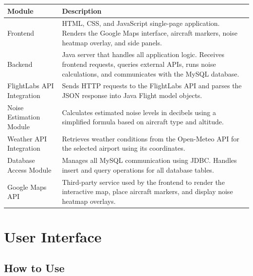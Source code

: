 \documentclass[12pt]{article}
\begin{document}
\begin{tabular}{|l|p{9.5cm}|}
\hline
Module & Description \\
\hline
Frontend & HTML, CSS, and JavaScript single-page application. Renders the Google Maps interface, aircraft markers, noise heatmap overlay, and side panels. \\
\hline
Backend & Java server that handles all application logic. Receives frontend requests, queries external APIs, runs noise calculations, and communicates with the MySQL database. \\
\hline
FlightLabs API Integration & Sends HTTP requests to the FlightLabs API and parses the JSON response into Java Flight model objects. \\
\hline
Noise Estimation Module & Calculates estimated noise levels in decibels using a simplified formula based on aircraft type and altitude. \\
\hline
Weather API Integration & Retrieves weather conditions from the Open-Meteo API for the selected airport using its coordinates. \\
\hline
Database Access Module & Manages all MySQL communication using JDBC. Handles insert and query operations for all database tables. \\
\hline
Google Maps API & Third-party service used by the frontend to render the interactive map, place aircraft markers, and display noise heatmap overlays. \\
\hline
\end{tabular}

\newpage

\section{User Interface}

\subsection{How to Use}
\end{document}
